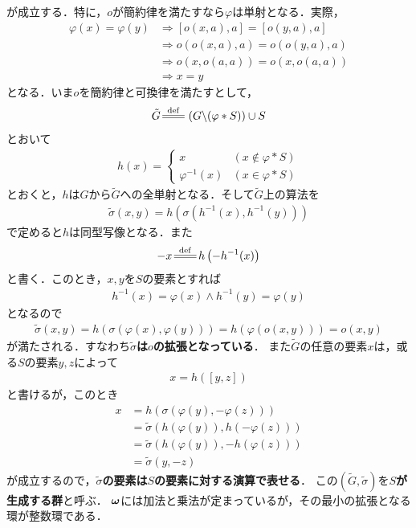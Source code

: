 	が成立する．特に，$o$が簡約律を満たすなら$\varphi$は単射となる．実際，
	\begin{align}
		\varphi(x) = \varphi(y)
		&\Longrightarrow [o(x,a),a] = [o(y,a),a] \\
		&\Longrightarrow o(o(x,a),a) = o(o(y,a),a) \\
		&\Longrightarrow o(x,o(a,a)) = o(x,o(a,a)) \\
		&\Longrightarrow x = y
	\end{align}
	となる．いま$o$を簡約律と可換律を満たすとして，
	\begin{align}
		\tilde{G} \defeq \left( G \backslash (\varphi \ast S) \right) \cup S
	\end{align}
	とおいて
	\begin{align}
		h(x) = 
		\begin{cases}
			x & (x \notin \varphi \ast S) \\
			\varphi^{-1}(x) & (x \in \varphi \ast S)
		\end{cases}
	\end{align}
	とおくと，$h$は$G$から$\tilde{G}$への全単射となる．そして$\tilde{G}$上の算法を
	\begin{align}
		\tilde{\sigma}(x,y) = h\left(\sigma\left(h^{-1}(x),h^{-1}(y)\right)\right)
	\end{align}
	で定めると$h$は同型写像となる．また
	\begin{align}
		-x \defeq h\left( -h^{-1}(x) \right)
	\end{align}
	と書く．このとき，$x,y$を$S$の要素とすれば
	\begin{align}
		h^{-1}(x) = \varphi(x) \wedge h^{-1}(y) = \varphi(y)
	\end{align}
	となるので
	\begin{align}
		\tilde{\sigma}(x,y) = h\left(\sigma\left(\varphi(x),\varphi(y)\right)\right)
		= h\left(\varphi(o(x,y))\right)
		= o(x,y)
	\end{align}
	が満たされる．すなわち{\bf $\tilde{\sigma}$は$o$の拡張となっている}．
	また$\tilde{G}$の任意の要素$x$は，或る$S$の要素$y,z$によって
	\begin{align}
		x = h([y,z])
	\end{align}
	と書けるが，このとき
	\begin{align}
		x &= h\left(\sigma(\varphi(y),-\varphi(z))\right) \\
		&= \tilde{\sigma} \left(h(\varphi(y)),h(-\varphi(z))\right) \\
		&= \tilde{\sigma} \left(h(\varphi(y)),-h(\varphi(z))\right) \\
		&= \tilde{\sigma}(y,-z)
	\end{align}
	が成立するので，{\bf $\tilde{\sigma}$の要素は$S$の要素に対する演算で表せる}．
	この$(\tilde{G},\tilde{\sigma})$を{\bf $S$が生成する群}と呼ぶ．
	${\boldsymbol \omega}$には加法と乗法が定まっているが，その最小の拡張となる環が整数環である．
	
